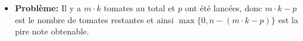 \begin{frame}
    \frametitle{\problemtitle}
    \begin{itemize}
        \item<+-> \textbf{Problème:} Il y a $m \cdot k$ tomates au total et $p$ ont été lancées, donc $m \cdot k - p$ est le nombre de tomates restantes et ainsi $\max\{0, n - (m \cdot k - p)\}$ est la pire note obtenable.
    \end{itemize}
\end{frame}
